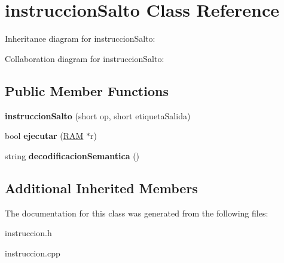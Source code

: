 \hypertarget{classinstruccionSalto}{}\section{instruccion\+Salto Class Reference}
\label{classinstruccionSalto}


Inheritance diagram for instruccion\+Salto\+:


Collaboration diagram for instruccion\+Salto\+:
\subsection*{Public Member Functions}
\begin{DoxyCompactItemize}
\item 
\hypertarget{classinstruccionSalto_a9845c654978990e78d70ba40d182997c}{}{\bfseries instruccion\+Salto} (short op, short etiqueta\+Salida)\label{classinstruccionSalto_a9845c654978990e78d70ba40d182997c}

\item 
\hypertarget{classinstruccionSalto_afcbdd63f9376cc97aea64abcdd0f5c52}{}bool {\bfseries ejecutar} (\hyperlink{classRAM}{R\+A\+M} $\ast$r)\label{classinstruccionSalto_afcbdd63f9376cc97aea64abcdd0f5c52}

\item 
\hypertarget{classinstruccionSalto_a60ef3ff88967452dc16eaf42e78f9f9a}{}string {\bfseries decodificacion\+Semantica} ()\label{classinstruccionSalto_a60ef3ff88967452dc16eaf42e78f9f9a}

\end{DoxyCompactItemize}
\subsection*{Additional Inherited Members}


The documentation for this class was generated from the following files\+:\begin{DoxyCompactItemize}
\item 
instruccion.\+h\item 
instruccion.\+cpp\end{DoxyCompactItemize}
